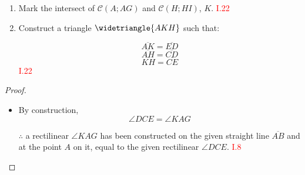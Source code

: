 \begin{enumerate}
\item Mark the intersect of $\mathscr{C}(A;AG)$ and $\mathscr{C}(H;HI)$, $K$. \hfill\textcolor{red}{I.22}

 \item Construct a triangle $\widetriangle{AKH}$ such that:
     
          \[\overline{AK} = \overline{ED}\]
           \[ \overline{AH} = \overline{CD}\]
           \[ \overline{KH} = \overline{CE}\]\hfill\textcolor{red}{I.22}
      

\begin{figure}[H]
	\caption{}
\end{figure}    
    
\end{enumerate}

\begin{proof}

\begin{itemize}

\item[]

\item By construction, 
\[\angle{DCE} = \angle{KAG}\]

\item[$\therefore$] a rectilinear $\angle{KAG}$ has been constructed on the given straight line $\overline{AB}$ and at the point $A$ on it, equal to the given rectilinear $\angle{DCE}$. \hfill\textcolor{red}{I.8}

\end{itemize}

\end{proof}

\clearpage
